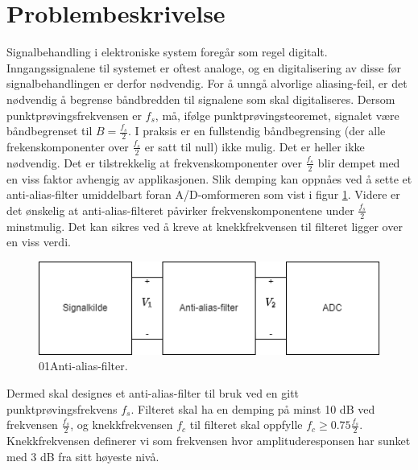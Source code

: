 \section{Problembeskrivelse}
\label{sec:issue}
Signalbehandling i elektroniske system foregår som regel digitalt. Inngangssignalene til systemet er oftest analoge, og en digitalisering av disse før signalbehandlingen er derfor nødvendig. For å unngå alvorlige aliasing-feil, er det nødvendig å begrense båndbredden til signalene som skal digitaliseres. Dersom punktprøvingsfrekvensen er $f_s$, må, ifølge punktprøvingsteoremet, signalet være båndbegrenset til $B = \frac {f_s} {2}$. 
I praksis er en fullstendig båndbegrensing (der alle frekenskomponenter over $\frac {f_s} {2}$ er satt til null) ikke mulig. Det er heller ikke nødvendig. Det er tilstrekkelig at frekvenskomponenter over $\frac {f_s} {2}$ blir dempet med en viss faktor avhengig av applikasjonen. Slik demping kan oppnåes ved å sette et anti-alias-filter umiddelbart foran A/D-omformeren som vist i figur \ref{fig:01Anti-alias-filter}.
Videre er det ønskelig at anti-alias-filteret påvirker frekvenskomponentene under $\frac {f_s} {2}$ minstmulig. Det kan sikres ved å kreve at knekkfrekvensen til filteret ligger over en viss verdi.

\begin{figure}[!hbt]
	\centering
	\includegraphics[scale=0.7]{./Images/01Issue/01Anti-alias-filter.png}
	\caption{01Anti-alias-filter.}
	\label{fig:01Anti-alias-filter}
\end{figure}

Dermed skal designes et anti-alias-filter til bruk ved en gitt punktprøvingsfrekvens $f_s$. Filteret skal ha en demping på minst 10 dB ved frekvensen $\frac {f_s} {2}$, og knekkfrekvensen $f_c$ til filteret skal oppfylle $f_c \geq 0.75\frac {f_s} {2}$. Knekkfrekvensen definerer vi som frekvensen hvor amplituderesponsen har sunket med 3 dB fra sitt høyeste nivå.